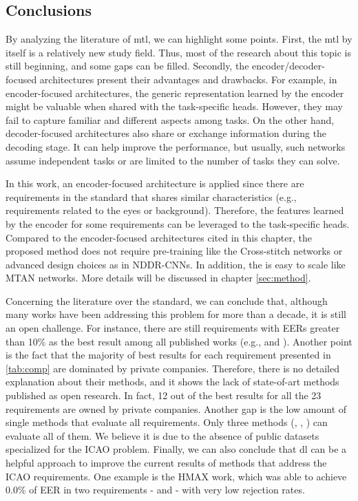 \subsection{Conclusions}

By analyzing the literature of \acl{mtl}, we can highlight some points. First, the \acs{mtl} by itself is a relatively new study field. Thus, most of the research about this topic is still beginning, and some gaps can be filled. Secondly, the encoder/decoder-focused architectures present their advantages and drawbacks. For example, in encoder-focused architectures, the generic representation learned by the encoder might be valuable when shared with the task-specific heads. However, they may fail to capture familiar and different aspects among tasks. On the other hand, decoder-focused architectures also share or exchange information during the decoding stage. It can help improve the performance, but usually, such networks assume independent tasks or are limited to the number of tasks they can solve. 

In this work, an encoder-focused architecture is applied since there are requirements in the \icao standard that shares similar characteristics (e.g., requirements related to the eyes or background). Therefore, the features learned by the encoder for some requirements can be leveraged to the task-specific heads. Compared to the encoder-focused architectures cited in this chapter, the proposed method does not require pre-training like the Cross-stitch networks or advanced design choices as in NDDR-CNNs. In addition, the \methodname is easy to scale like MTAN networks. More details will be discussed in chapter \ref{sec:method}.

Concerning the literature over the \icao standard, we can conclude that, although many works have been addressing this problem for more than a decade, it is still an open challenge. For instance, there are still requirements with EERs greater than 10\% as the best result among all published works (e.g., \citeReq{\lookingaway} and \citeReq{\hairacrosseyes}). Another point is the fact that the majority of best results for each requirement presented in \autoref{tab:comp} are dominated by private companies. Therefore, there is no detailed explanation about their methods, and it shows the lack of state-of-art methods published as open research. In fact, 12 out of the best results for all the 23 requirements are owned by private companies. Another gap is the low amount of single methods that evaluate all requirements. Only three methods (\biolab, \biotest, \biopass) can evaluate all of them. We believe it is due to the absence of public datasets specialized for the ICAO problem. Finally, we can also conclude that \acl{dl} can be a helpful approach to improve the current results of methods that address the ICAO requirements. One example is the HMAX work, which was able to achieve 0.0\% of EER in two requirements - \citeReq{\framestooheavy} and \citeReq{\framecoveringeyes} - with very low rejection rates.
